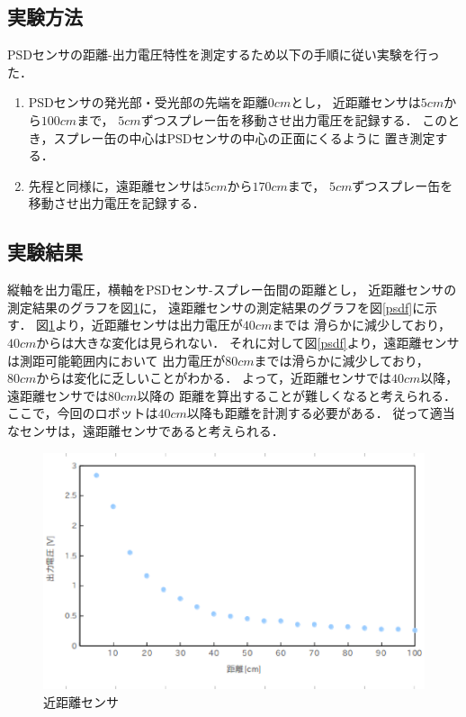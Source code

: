 \documentclass[11pt,a4]{jsarticle}
\begin{document}
\subsection{実験方法}
PSDセンサの距離-出力電圧特性を測定するため以下の手順に従い実験を行った．
\begin{enumerate}
 \item PSDセンサの発光部・受光部の先端を距離$0\unit{cm}$とし，
       近距離センサは$5\unit{cm}$から$100\unit{cm}$まで，
       $5\unit{cm}$ずつスプレー缶を移動させ出力電圧を記録する．
       このとき，スプレー缶の中心はPSDセンサの中心の正面にくるように
       置き測定する．
 \item 先程と同様に，遠距離センサは$5\unit{cm}$から$170\unit{cm}$まで，
       $5\unit{cm}$ずつスプレー缶を移動させ出力電圧を記録する．
\end{enumerate}

\subsection{実験結果}
縦軸を出力電圧，横軸をPSDセンサ-スプレー缶間の距離とし，
近距離センサの測定結果のグラフを図\ref{psdn}に，
遠距離センサの測定結果のグラフを図\ref{psdf}に示す．
図\ref{psdn}より，近距離センサは出力電圧が$40\unit{cm}$までは
滑らかに減少しており，$40\unit{cm}$からは大きな変化は見られない．
それに対して図\ref{psdf}より，遠距離センサは測距可能範囲内において
出力電圧が$80\unit{cm}$までは滑らかに減少しており，
$80\unit{cm}$からは変化に乏しいことがわかる．
よって，近距離センサでは$40\unit{cm}$以降，遠距離センサでは$80\unit{cm}$以降の
距離を算出することが難しくなると考えられる．
ここで，今回のロボットは$40\unit{cm}$以降も距離を計測する必要がある．
従って適当なセンサは，遠距離センサであると考えられる．


\newpage
\begin{figure}[htb]
  \begin{center}
    \includegraphics[width=1.0\hsize]{picture/psdn.eps}
    \caption{近距離センサ}
    \label{psdn}
  \end{center}
\end{figure}
\end{document}

